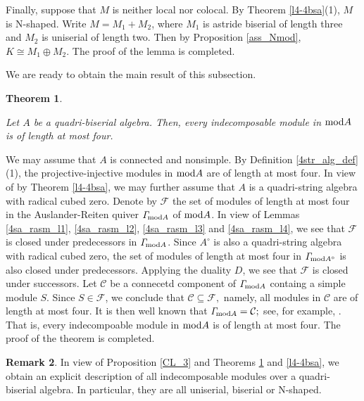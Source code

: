 \documentclass[10pt]{amsart}
\newtheorem{Theo}{Theorem}[subsection]
\theoremstyle{definition}
\newtheorem{Remark}[Theo]{Remark}
\newcommand{\mmod}{{\rm mod}}
\def\Ga{\hbox{$\mathit\Gamma\hspace{-2pt}$}}
\begin{document}
Finally, suppose that $M$ is neither local nor colocal. By Theorem \ref{l4-4bsa}(1), $M$ is N-shaped. Write $M=M_1+M_2$, where $M_1$ is astride  biserial of length three and $M_2$ is uniserial of length two. Then by Proposition \ref{ass_Nmod}, $K\cong M_1 \oplus M_2.$ The proof of the lemma is completed.


\vspace{4pt}

We are ready to obtain the main result of this subsection.

\begin{Theo}\label{rb_4bsa}

Let $A$ be a quadri-biserial algebra. Then, every indecomposable module in $\mmod A$ is of length at most four.

\end{Theo}

 We may assume that $A$ is connected and nonsimple. By Definition \ref{4str_alg_def}(1), the projective-injective modules in $\mmod A$ are of length at most four. In view of by Theorem \ref{l4-4bsa}, we may further assume that $A$ is a quadri-string algebra with radical cubed zero. Denote by $\mathcal F$ the set of modules of length at most four in the Auslander-Reiten quiver $\Ga_{\mmod A}$ of $\mmod A$. In view of Lemmas \ref{4sa_rasm_l1}, \ref{4sa_rasm_l2}, \ref{4sa_rasm_l3} and \ref{4sa_rasm_l4}, we see that $\mathcal F$ is closed under predecessors in $\Ga_{\mmod A}$. Since $A^\circ$ is also a quadri-string algebra with radical cubed zero, the set of modules of length at most four in $\Ga_{\mmod A^\circ}$ is also closed under predecessors. Applying the duality $D$, we see that $\mathcal F$ is closed under successors. Let $\mathcal C$ be a connecetd component of $\Ga_{\mmod A}$ containg a simple module $S$. Since $S\in \mathcal{F}$, we conclude that $\mathcal{C}\subseteq \mathcal{F},$ namely, all modules in $\mathcal C$ are of length at most four. It is then well known that $\Ga_{\mmod A}=\mathcal C;$ see, for example, \cite[(VI.1.4)]{ARS}. That is, every indecompoable module in $\mmod A$ is of length at most four. The proof of the theorem is completed. 

\begin{Remark}

In view of Proposition \ref{CL_3} and Theorems \ref{rb_4bsa} and \ref{l4-4bsa}, we obtain an explicit description of all indecomposable modules over a quadri-biserial algebra. In particular, they are all uniserial, biserial or N-shaped.
    
\end{Remark}
\end{document}
